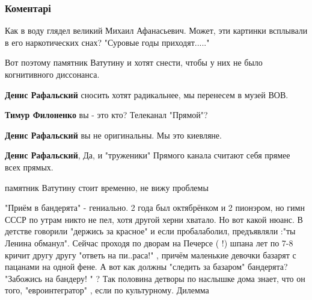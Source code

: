  
 
 
 
 
\subsubsection{Коментарі}
\label{sec:31_07_2020.fb.lesev_igor.1.kiev_shkola_gimn.cmt}

\begin{itemize} %
Как в воду глядел великий Михаил Афанасьевич. Может, эти картинки всплывали в его наркотических снах? "Суровые годы приходят....."

Вот поэтому памятник Ватутину и хотят снести, чтобы у них не было когнитивного диссонанса.

\begin{itemize} %
\textbf{Денис Рафальский} сносить хотят радикальнее, мы перенесем в музей ВОВ.

\textbf{Тимур Филоненко} вы - это кто? Телеканал "Прямой"?

\textbf{Денис Рафальский} вы не оригинальны. Мы это киевляне.

\textbf{Денис Рафальский}, Да, и "труженики" Прямого канала считают себя прямее всех прямых.
\end{itemize} %

памятник Ватутину стоит временно, не вижу проблемы


"Приём в бандерята" - гениально. 2 года был октябрёнком и 2 пионэром, но гимн
СССР по утрам никто не пел, хотя другой херни хватало. Но вот какой нюанс. В
детстве говорили "держись за красное" и если пробалаболил, предъявляли :"ты
Ленина обманул". Сейчас проходя по дворам на Печерсе ( !) шпана лет по 7-8
кричит другу другу "ответь на пи..раса!" , причём маленькие девочки базарят с
пацанами на одной фене. А вот как должны "следить за базаром" бандерята?
"Забожись на бандеру! " ? Так половина детворы по наслышке дома знает, что он
того, "евроинтегратор" , если по культурному. Дилемма


\end{itemize}
